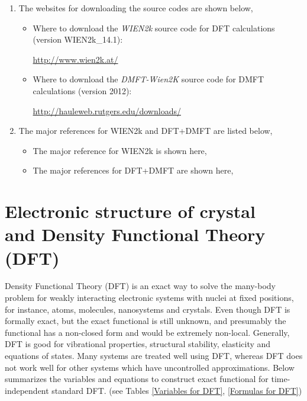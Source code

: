 \documentclass[12 pt]{article}
\begin{document}
  \begin{enumerate}
 
  \item The websites for downloading the source codes are shown below, 

  \begin{itemize}[leftmargin=0.5in]

    \item Where to download the \emph{WIEN2k} source code for DFT calculations (version WIEN2k\_14.1): 

  \url{http://www.wien2k.at/}

    \item Where to download the \emph{DMFT-Wien2K} source code for DMFT calculations (version 2012): 

  \url{http://hauleweb.rutgers.edu/downloads/}

  \end{itemize}

  \item The major references for WIEN2k and DFT+DMFT are listed below,

  \begin{itemize}[leftmargin=0.5in]

   \item The major reference for WIEN2k is shown here, 

  \citep{Haule2010}

   \item The major references for DFT+DMFT are shown here, 

  \citep{Blaha2001, Kotliar2004, Kotliar2006}

  \end{itemize}

  \end{enumerate}
  \cleardoublepage

    \section{\texorpdfstring{Electronic structure of crystal \\and Density Functional Theory (DFT)}{Electronic 
structure of crystal and Density Functional Theory (DFT)}}

  Density Functional Theory (DFT) is an exact way to solve the many-body problem for weakly interacting electronic 
systems with nuclei at fixed positions, for instance, atoms, molecules, nanosystems and crystals. Even though DFT 
is formally exact, but the exact functional is still unknown, and presumably the functional has a non-closed form 
and would be extremely non-local. Generally, DFT is good for vibrational properties, structural stability, 
elasticity and equations of states. Many systems are treated well using DFT, whereas DFT does not work well for 
other systems which have uncontrolled approximations. Below summarizes the variables and equations to construct 
exact functional for time-independent standard DFT. (see Tables \ref{Variables for DFT}, \ref{Formulas for DFT}) 
\end{document}
